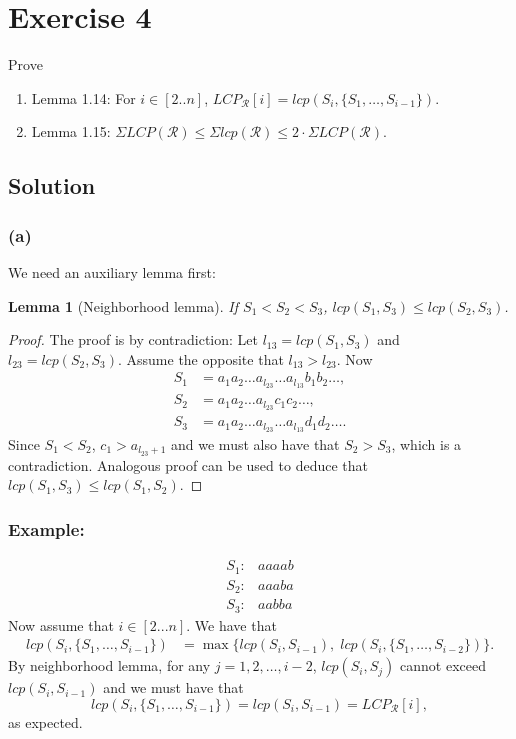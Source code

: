 \documentclass[10pt]{article}
\newtheorem{lemma}{Lemma}
\begin{document}
\section*{Exercise 4}
\color{blue}
Prove
\begin{enumerate}[label=(\alph*)]
\item Lemma 1.14: For $i \in [2..n]$, $LCP_{\mathcal{R}}[i] = lcp(S_i, \{ S_1, \dots, S_{i - 1} \})$.
\item Lemma 1.15: $\Sigma LCP(\mathcal{R}) \leq \Sigma lcp(\mathcal{R}) \leq 2 \cdot \Sigma LCP(\mathcal{R})$.
\end{enumerate}
\color{black}
\subsection*{Solution}

\subsubsection*{(a)}
We need an auxiliary lemma first: 
\begin{lemma}[Neighborhood lemma]
If $S_1 < S_2 < S_3$, $lcp(S_1, S_3) \leq lcp(S_2, S_3)$.
\end{lemma}
\begin{proof}
The proof is by contradiction: Let $l_{13} = lcp(S_1, S_3)$ and $l_{23} = lcp(S_2, S_3)$. Assume the opposite that $l_{13} > l_{23}$. 
Now 
\begin{align*}
S_1 &= a_1 a_2 \dots a_{l_{23}} \dots a_{l_{13}} b_1 b_2 \dots, \\
S_2 &= a_1 a_2 \dots a_{l_{23}} c_1 c_2 \dots, \\
S_3 &= a_1 a_2 \dots a_{l_{23}} \dots a_{l_{13}} d_1 d_2 \dots.
\end{align*}
Since $S_1 < S_2$, $c_1 > a_{l_{23} + 1}$ and we must also have that $S_2 > S_3$, which is a contradiction. Analogous proof can be used to deduce that $lcp(S_1, S_3) \leq lcp(S_1, S_2)$.
\end{proof}
\subsubsection*{Example:}
\begin{align*}
S_1: & aaaab \\
S_2: & aaaba \\
S_3: & aabba
\end{align*}
Now assume that $i \in [2...n]$. We have that
\begin{align*}
lcp(S_i, \{ S_1, \dots, S_{i - 1} \}) &= \max \{ lcp(S_i, S_{i - 1}), \; lcp(S_i, \{ S_1, \dots, S_{i - 2} \}) \}.
\end{align*}
By neighborhood lemma, for any $j = 1, 2, \dots, i - 2$, $lcp(S_i, S_j)$ cannot exceed $lcp(S_i, S_{i - 1})$ and we must have that 
\[
lcp(S_i, \{ S_1, \dots, S_{i - 1} \}) = lcp(S_i, S_{i - 1}) = LCP_{\mathcal{R}}[i],
\] 
as expected. 
\end{document}
